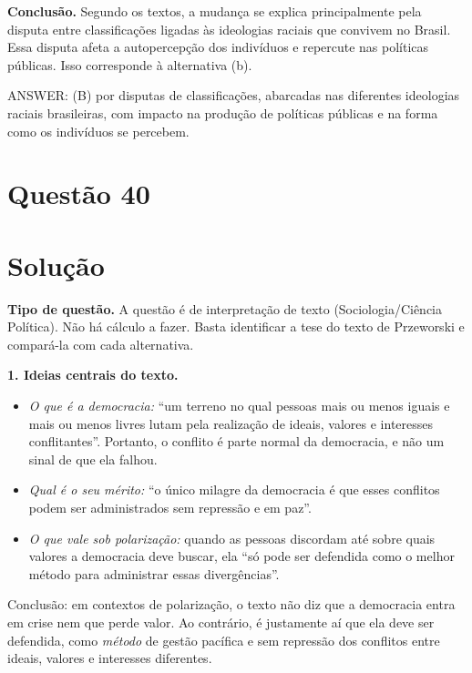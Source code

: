 \documentclass{article}%
\begin{document}
\textbf{Conclusão.} Segundo os textos, a mudança se explica principalmente pela disputa entre classificações ligadas às ideologias raciais que convivem no Brasil. Essa disputa afeta a autopercepção dos indivíduos e repercute nas políticas públicas. Isso corresponde à alternativa (b).

ANSWER: (B) por disputas de classificações, abarcadas nas diferentes ideologias raciais brasileiras, com impacto na produção de políticas públicas e na forma como os indivíduos se percebem.%
\newpage%
\section*{Questão 40}

\section*{Solução}

\textbf{Tipo de questão.} A questão é de interpretação de texto (Sociologia/Ciência Política). Não há cálculo a fazer. Basta identificar a tese do texto de Przeworski e compará-la com cada alternativa.

\medskip
\textbf{1. Ideias centrais do texto.}
\begin{itemize}
  \item \emph{O que é a democracia:} ``um terreno no qual pessoas mais ou menos iguais e mais ou menos livres lutam pela realização de ideais, valores e interesses conflitantes''. Portanto, o conflito é parte normal da democracia, e não um sinal de que ela falhou.
  \item \emph{Qual é o seu mérito:} ``o único milagre da democracia é que esses conflitos podem ser administrados sem repressão e em paz''.
  \item \emph{O que vale sob polarização:} quando as pessoas discordam até sobre quais valores a democracia deve buscar, ela ``só pode ser defendida como o melhor método para administrar essas divergências''.
\end{itemize}
Conclusão: em contextos de polarização, o texto não diz que a democracia entra em crise nem que perde valor. Ao contrário, é justamente aí que ela deve ser defendida, como \emph{método} de gestão pacífica e sem repressão dos conflitos entre ideais, valores e interesses diferentes.
\end{document}

